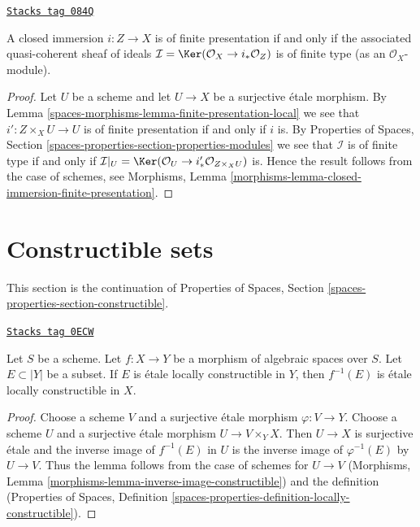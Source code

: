 \begin{lemma}
\label{spaces-morphisms-lemma-closed-immersion-finite-presentation}
\href{https://stacks.math.columbia.edu/tag/084Q}{\texttt{Stacks tag 084Q}}

A closed immersion $i : Z \to X$ is of finite presentation if and only if
the associated quasi-coherent sheaf of ideals
$\mathcal{I} = \Ker(\mathcal{O}_X \to i_*\mathcal{O}_Z)$
is of finite type (as an $\mathcal{O}_X$-module).
\end{lemma}

\begin{proof}
Let $U$ be a scheme and let $U \to X$ be a surjective \'etale morphism.
By Lemma \ref{spaces-morphisms-lemma-finite-presentation-local}
we see that $i' : Z \times_X U \to U$ is of finite presentation if and
only if $i$ is. By Properties of Spaces, Section
\ref{spaces-properties-section-properties-modules}
we see that $\mathcal{I}$ is of finite type if and only if
$\mathcal{I}|_U = \Ker(\mathcal{O}_U \to i'_*\mathcal{O}_{Z \times_X U})$
is. Hence the result follows from the case of schemes, see Morphisms,
Lemma \ref{morphisms-lemma-closed-immersion-finite-presentation}.
\end{proof}

\section{Constructible sets}
\label{spaces-morphisms-section-constructible}
This section is the continuation of
Properties of Spaces, Section \ref{spaces-properties-section-constructible}.

\begin{lemma}
\label{spaces-morphisms-lemma-inverse-image-constructible}
\href{https://stacks.math.columbia.edu/tag/0ECW}{\texttt{Stacks tag 0ECW}}

Let $S$ be a scheme.
Let $f : X \to Y$ be a morphism of algebraic spaces over $S$.
Let $E \subset |Y|$ be a subset.
If $E$ is \'etale locally constructible in $Y$, then
$f^{-1}(E)$ is \'etale locally constructible in $X$.
\end{lemma}

\begin{proof}
Choose a scheme $V$ and a surjective \'etale morphism $\varphi : V \to Y$.
Choose a scheme $U$ and a surjective \'etale morphism
$U \to V \times_Y X$. Then $U \to X$ is surjective \'etale
and the inverse image of $f^{-1}(E)$ in $U$ is the inverse
image of $\varphi^{-1}(E)$ by $U \to V$. Thus the lemma follows
from the case of schemes for $U \to V$
(Morphisms, Lemma \ref{morphisms-lemma-inverse-image-constructible})
and the definition (Properties of Spaces, Definition
\ref{spaces-properties-definition-locally-constructible}).
\end{proof}

